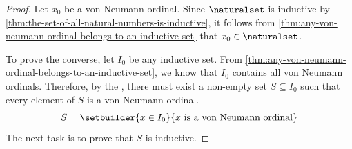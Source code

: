 \begin{proof}
    Let \( x_{0} \) be a von Neumann ordinal. Since \( \naturalset \) is inductive by \cref{thm:the-set-of-all-natural-numbers-is-inductive},
    it follows from \cref{thm:any-von-neumann-ordinal-belongs-to-an-inductive-set} that \( x_{0} \in \naturalset \).

    \vspace{0.3cm}
    \noindent
    To prove the converse, let \( I_{0} \) be any inductive set. From \cref{thm:any-von-neumann-ordinal-belongs-to-an-inductive-set},
    we know that \( I_{0} \) contains all von Neumann ordinals. Therefore, by the , there must exist a non-empty set
    \( S \subseteq I_{0} \) such that every element of \( S \) is a von Neumann ordinal.
    \begin{equation}
        \label{eq:S-is-a-subset-of-I0-that-contains-all-von-Neumann-ordinals}
        S = \setbuilder{x \in I_{0}}{\text{\( x \) is a von Neumann ordinal}}
    \end{equation}
    The next task is to prove that \( S \) is inductive.


\end{proof}
